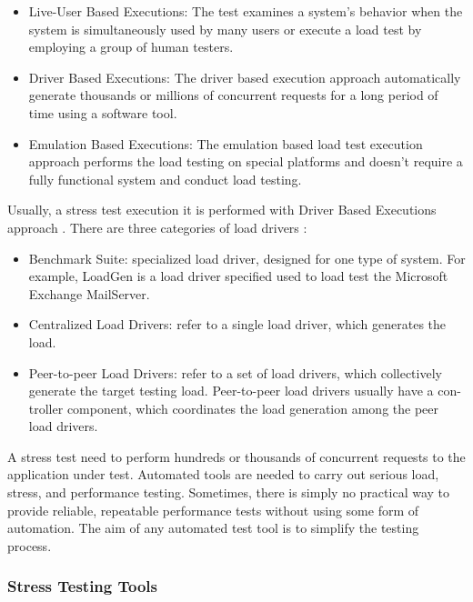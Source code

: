 \documentclass{report}
\begin{document}
\begin{itemize}
\item Live-User Based Executions: The test examines a system’s behavior when the system is simultaneously used by many users or execute a load test by employing a group of human testers. 
\item Driver Based Executions: The driver based execution approach automatically generate thousands or millions of concurrent requests for a long period of time using a software tool.
\item Emulation Based Executions: The emulation based load test execution approach performs the load testing on special platforms and doesn't require a fully functional system and conduct load testing.
\end{itemize}

Usually, a stress test execution it is performed with Driver Based Executions approach \cite{Erinle2013} \cite{MohammadS.Obaidat} \cite{Wang2013}. There are three categories of load drivers \cite{Jiang2010}: 

\begin{itemize}
\item Benchmark Suite: specialized load driver, designed for one type of system. For example, LoadGen is a load driver specified used to load test the Microsoft Exchange MailServer.
\item  Centralized Load Drivers: refer to a single load driver, which generates the load.
\item Peer-to-peer Load Drivers: refer to a set of load drivers, which collectively generate the target testing load. Peer-to-peer load drivers usually have a con- troller component, which coordinates the load generation among the peer load drivers. 
\end{itemize}

A stress test need to perform hundreds or thousands of concurrent requests  to the application under test. Automated tools are needed to carry out serious load, stress, and performance testing. Sometimes, there is simply no practical way to provide reliable, repeatable performance tests without using some form of automation. The aim of any automated test tool is to simplify the testing process. 


\subsubsection{Stress Testing Tools}
\end{document}
